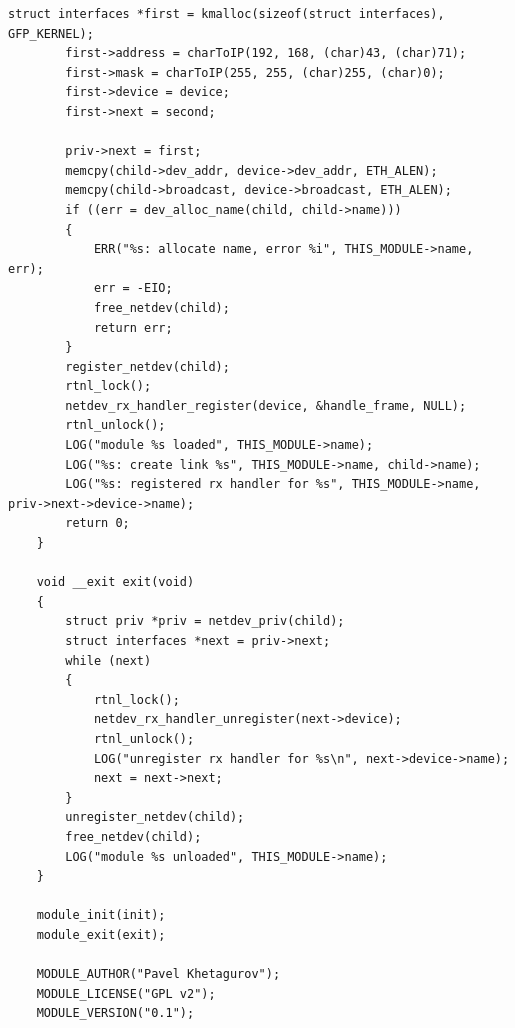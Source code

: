\documentclass[14pt, a4paper]{extarticle}
\begin{document}
\begin{lstlisting}[caption=Полный код разработанного модуля ядра]
		struct interfaces *first = kmalloc(sizeof(struct interfaces), GFP_KERNEL);
		first->address = charToIP(192, 168, (char)43, (char)71);
		first->mask = charToIP(255, 255, (char)255, (char)0);
		first->device = device;
		first->next = second;
		
		priv->next = first;
		memcpy(child->dev_addr, device->dev_addr, ETH_ALEN);
		memcpy(child->broadcast, device->broadcast, ETH_ALEN);
		if ((err = dev_alloc_name(child, child->name)))
		{
			ERR("%s: allocate name, error %i", THIS_MODULE->name, err);
			err = -EIO;
			free_netdev(child);
			return err;
		}
		register_netdev(child);
		rtnl_lock();
		netdev_rx_handler_register(device, &handle_frame, NULL);
		rtnl_unlock();
		LOG("module %s loaded", THIS_MODULE->name);
		LOG("%s: create link %s", THIS_MODULE->name, child->name);
		LOG("%s: registered rx handler for %s", THIS_MODULE->name, priv->next->device->name);
		return 0;
	}
	
	void __exit exit(void)
	{
		struct priv *priv = netdev_priv(child);
		struct interfaces *next = priv->next;
		while (next)
		{
			rtnl_lock();
			netdev_rx_handler_unregister(next->device);
			rtnl_unlock();
			LOG("unregister rx handler for %s\n", next->device->name);
			next = next->next;
		}
		unregister_netdev(child);
		free_netdev(child);
		LOG("module %s unloaded", THIS_MODULE->name);
	}
	
	module_init(init);
	module_exit(exit);
	
	MODULE_AUTHOR("Pavel Khetagurov");
	MODULE_LICENSE("GPL v2");
	MODULE_VERSION("0.1");
\end{lstlisting}
\end{document}
